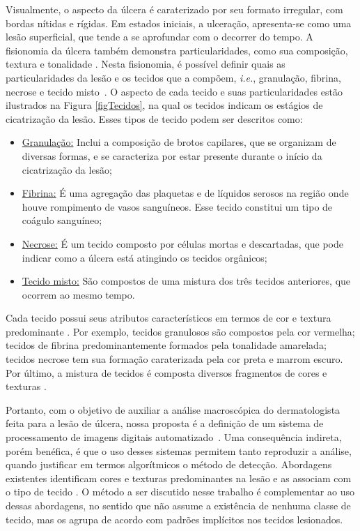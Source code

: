 Visualmente, o aspecto da úlcera é caraterizado por seu formato irregular, com bordas nítidas e rígidas. 
Em estados iniciais, a ulceração, apresenta-se como uma lesão superficial, que tende a se aprofundar com o decorrer do tempo.
A fisionomia da úlcera também demonstra particularidades, como sua composição, textura e tonalidade \cite{Dorileo2010}. 
Nesta fisionomia, é possível definir quais as particularidades da lesão e os tecidos que a compõem, \textit{i.e.}, granulação, fibrina, necrose e tecido misto~\cite{Pereyra2014}. 
O aspecto de cada tecido e suas particularidades estão ilustrados na Figura \ref{figTecidos}, na qual os tecidos indicam os estágios de cicatrização da lesão. 
Esses tipos de tecido podem ser descritos como: 

\begin{itemize}
\item \underline{Granulação:} Inclui a composição de brotos capilares, que se organizam de diversas formas, e se caracteriza por estar presente durante o início da cicatrização da lesão; 

\item \underline{Fibrina:} É uma agregação das plaquetas e de líquidos serosos na região onde houve rompimento de vasos sanguíneos.
Esse tecido constitui um tipo de coágulo sanguíneo; 

\item \underline{Necrose:} É um tecido composto por células mortas e descartadas, que pode indicar como a úlcera está atingindo os tecidos orgânicos;

\item \underline{Tecido misto:} São compostos de uma mistura dos três tecidos anteriores, que ocorrem ao mesmo tempo.
\end{itemize}


Cada tecido possui seus atributos característicos em termos de cor e textura predominante \cite{Pereira2011}.
Por exemplo, tecidos granulosos são compostos pela cor vermelha; tecidos de fibrina predominantemente formados pela tonalidade amarelada; tecidos necrose tem sua formação caraterizada pela cor preta e marrom escuro. Por último, a mistura de tecidos é composta diversos fragmentos de cores e texturas \cite{Chino2018}.   

Portanto, com o objetivo de auxiliar a análise macroscópica do dermatologista feita para a lesão de úlcera, nossa proposta é a definição de um sistema de processamento de imagens digitais automatizado~\cite{Gonzalez2008}.
Uma consequência indireta, porém benéfica, é que o uso desses sistemas permitem tanto reproduzir a análise, quando justificar em termos algorítmicos o método de detecção.
Abordagens existentes identificam cores e texturas predominantes na lesão e as associam com o tipo de tecido \cite{Chino2018,Blanco2016}.
O método a ser discutido nesse trabalho é complementar ao uso dessas abordagens, no sentido que não assume a existência de nenhuma classe de tecido, mas os agrupa de acordo com padrões implícitos nos tecidos lesionados.


